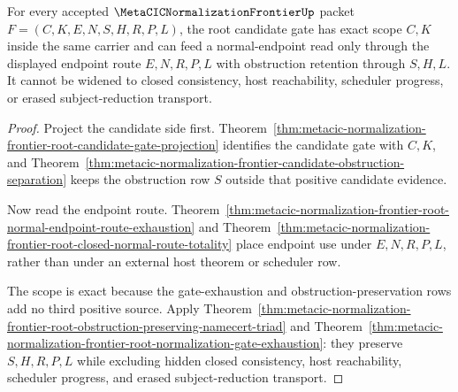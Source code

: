 \begin{theorem}
\label{thm:metacic-normalization-frontier-root-gate-scope-exactness}
For every accepted $\MetaCICNormalizationFrontierUp$ packet $F=(C,K,E,N,S,H,R,P,L)$, the root candidate gate has exact scope $C,K$ inside the same carrier and can feed a normal-endpoint read only through the displayed endpoint route $E,N,R,P,L$ with obstruction retention through $S,H,L$. It cannot be widened to closed consistency, host reachability, scheduler progress, or erased subject-reduction transport.
\end{theorem}
\begin{proof}
Project the candidate side first. Theorem~\ref{thm:metacic-normalization-frontier-root-candidate-gate-projection} identifies the candidate gate with $C,K$, and Theorem~\ref{thm:metacic-normalization-frontier-candidate-obstruction-separation} keeps the obstruction row $S$ outside that positive candidate evidence.

Now read the endpoint route. Theorem~\ref{thm:metacic-normalization-frontier-root-normal-endpoint-route-exhaustion} and Theorem~\ref{thm:metacic-normalization-frontier-root-closed-normal-route-totality} place endpoint use under $E,N,R,P,L$, rather than under an external host theorem or scheduler row.

The scope is exact because the gate-exhaustion and obstruction-preservation rows add no third positive source. Apply Theorem~\ref{thm:metacic-normalization-frontier-root-obstruction-preserving-namecert-triad} and Theorem~\ref{thm:metacic-normalization-frontier-root-normalization-gate-exhaustion}: they preserve $S,H,R,P,L$ while excluding hidden closed consistency, host reachability, scheduler progress, and erased subject-reduction transport.
\end{proof}

